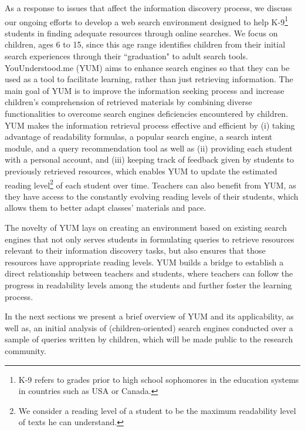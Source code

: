 \documentclass{sig-alternate-05-2015}
\begin{document}
As a response to issues that affect the information discovery process,  we discuss our ongoing efforts to develop a web search environment designed to help K-9\footnote{ K-9 refers to grades prior to high school sophomores in the education systems in countries such as USA or Canada.} students in finding adequate resources through online searches. We focus on children, ages 6 to 15, since this age range identifies children from their initial search experiences through their ``graduation" to adult search tools. YouUnderstood.me (YUM) aims to enhance search engines so that they can be used as a tool to facilitate learning, rather than just retrieving information. The main goal of YUM is to improve the information seeking process and increase children's comprehension of retrieved materials by combining diverse functionalities to overcome search engines deficiencies encountered by children. YUM makes the information retrieval process effective and efficient by (i) taking advantage of readability formulas, a popular search engine, a search intent module, and a query recommendation tool as well as (ii) providing each student with a personal account, and (iii) keeping track of feedback given by students to previously retrieved resources, which enables YUM to update the estimated reading  level\footnote{We consider a reading level of a student to be the maximum readability level of texts he can understand.} of each student over time.  Teachers can also benefit from YUM, as they have access to the constantly evolving reading levels of their students, which allows them to better adapt classes' materials and pace. 

The novelty of YUM lays on creating an environment based on existing search engines that not only serves students in formulating queries to retrieve resources relevant to their information discovery tasks, but also ensures that those resources have appropriate reading levels. YUM builds a bridge to establish a direct relationship between teachers and students, where teachers can follow the progress in readability levels among the students and further foster the learning process.


In the next sections we present a brief overview of YUM and its applicability,  as well as, an initial analysis of (children-oriented) search engines conducted over a sample of queries written by children, which will be made public to the research community.
\end{document}

